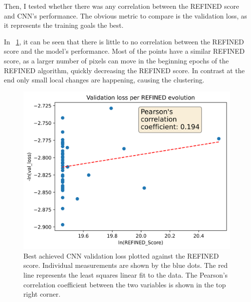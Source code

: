 Then, I tested whether there was any correlation between the REFINED score and CNN's performance. The obvious metric to compare is the validation loss, as it represents the training goals the best.

In ~\ref{fig:REFINED_progression}, it can be seen that there is little to no correlation between the REFINED score and the model's performance. Most of the points have a similar REFINED score, as a larger number of pixels can move in the beginning epochs of the REFINED algorithm, quickly decreasing the REFINED score. In contrast at the end only small local changes are happening, causing the clustering.

\begin{figure}
    \centering
    \includegraphics[width=0.75\linewidth]{progression.png}
    \caption{Best achieved CNN validation loss plotted against the REFINED score. Individual measurements are shown by the blue dots. The red line represents the least squares linear fit to the data. The Pearson's correlation coefficient between the two variables is shown in the top right corner.}
    \label{fig:REFINED_progression}
\end{figure}

